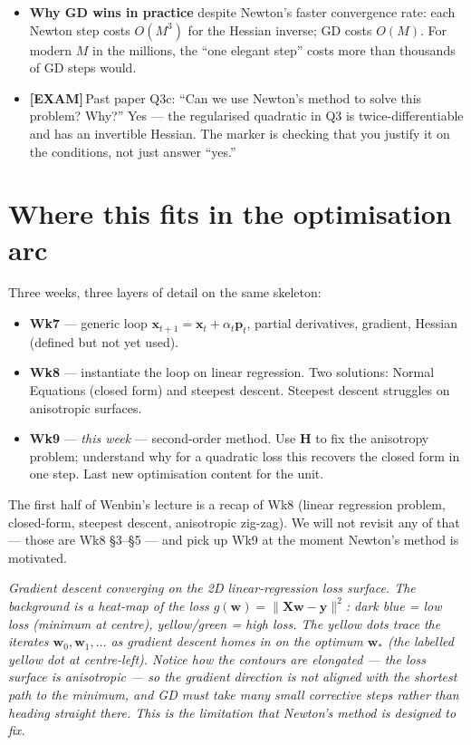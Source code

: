 \documentclass[11pt, a4paper]{article}
\newcommand{\examflag}{\textcolor{tipBd}{\textbf{[EXAM]}}\,}
\begin{document}
\begin{tldrbox}
\begin{itemize}[leftmargin=*]
  \item \textbf{Why GD wins in practice} despite Newton's faster convergence rate: each Newton step costs $O(M^3)$ for the Hessian inverse; GD costs $O(M)$. For modern $M$ in the millions, the ``one elegant step'' costs more than thousands of GD steps would.
  \item \examflag{}Past paper Q3c: ``Can we use Newton's method to solve this problem? Why?'' Yes — the regularised quadratic in Q3 is twice-differentiable and has an invertible Hessian. The marker is checking that you justify it on the conditions, not just answer ``yes.''
\end{itemize}
\end{tldrbox}

\section{Where this fits in the optimisation arc}

Three weeks, three layers of detail on the same skeleton:
\begin{itemize}
  \item \textbf{Wk7} — generic loop $\mathbf{x}_{t+1} = \mathbf{x}_t + \alpha_t\mathbf{p}_t$, partial derivatives, gradient, Hessian (defined but not yet used).
  \item \textbf{Wk8} — instantiate the loop on linear regression. Two solutions: Normal Equations (closed form) and steepest descent. Steepest descent struggles on anisotropic surfaces.
  \item \textbf{Wk9} — \emph{this week} — second-order method. Use $\mathbf{H}$ to fix the anisotropy problem; understand why for a quadratic loss this recovers the closed form in one step. Last new optimisation content for the unit.
\end{itemize}

The first half of Wenbin's lecture is a recap of Wk8 (linear regression problem, closed-form, steepest descent, anisotropic zig-zag). We will not revisit any of that — those are Wk8 §3--§5 — and pick up Wk9 at the moment Newton's method is motivated.

\begin{center}

\footnotesize\textit{Gradient descent converging on the 2D linear-regression loss surface. The background is a heat-map of the loss $g(\mathbf{w}) = \|\mathbf{X}\mathbf{w} - \mathbf{y}\|^2$: dark blue = low loss (minimum at centre), yellow/green = high loss. The yellow dots trace the iterates $\mathbf{w}_0, \mathbf{w}_1, \ldots$ as gradient descent homes in on the optimum $\mathbf{w}_*$ (the labelled yellow dot at centre-left). Notice how the contours are elongated --- the loss surface is \emph{anisotropic} --- so the gradient direction is not aligned with the shortest path to the minimum, and GD must take many small corrective steps rather than heading straight there. This is the limitation that Newton's method is designed to fix.}
\end{center}
\end{document}
